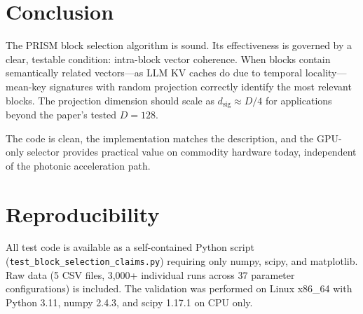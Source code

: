\documentclass[11pt]{article}
\begin{document}
\section{Conclusion}

The PRISM block selection algorithm is sound. Its effectiveness is governed by a clear, testable condition: intra-block vector coherence. When blocks contain semantically related vectors---as LLM KV caches do due to temporal locality---mean-key signatures with random projection correctly identify the most relevant blocks. The projection dimension should scale as $d_\text{sig} \approx D/4$ for applications beyond the paper's tested $D = 128$.

The code is clean, the implementation matches the description, and the GPU-only selector provides practical value on commodity hardware today, independent of the photonic acceleration path.

\section*{Reproducibility}

All test code is available as a self-contained Python script (\texttt{test\_block\_selection\_claims.py}) requiring only numpy, scipy, and matplotlib. Raw data (5 CSV files, 3{,}000+ individual runs across 37 parameter configurations) is included. The validation was performed on Linux x86\_64 with Python 3.11, numpy 2.4.3, and scipy 1.17.1 on CPU only.
\end{document}
